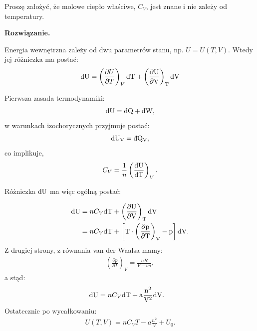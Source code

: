 \documentclass[11pt,a4paper]{article}
\newcommand{\dbar} {\ensuremath{\,\mathchar'26\mkern-12mu d}}
\newenvironment{solution}{\vspace{1cm} \par\textbf{Rozwiązanie.} \vspace{1cm}}{}
\begin{document}
Proszę założyć, że molowe ciepło właściwe, $C_V$, jest znane i nie zależy od temperatury.

\begin{solution}

Energia wewnętrzna zależy od dwu parametrów stanu, np. $U = U(T, V)$. Wtedy jej różniczka ma postać:
\begin{align}
  \rm{d} U &= \left(\frac{\partial U}{\partial T} \right)_V \rm{d}T  + \left(\frac{\partial U}{\partial V} \right)_T \rm{d}V \\
\end{align}

Pierwsza zasada termodynamiki:
\begin{align}
\rm{d}U = \rm{\dbar}Q + \rm{\dbar}W,
\end{align}
w warunkach izochorycznych przyjmuje postać:
\begin{align}
\rm{d}U_V = \rm{\dbar}Q _V, 
\end{align}
co implikuje,
\begin{align}
C_V = \frac{1}{n}\left( \frac{\rm{d}U}{\rm{d}T}\right)_V.
\end{align}

Różniczka $\rm{d}U$ ma więc ogólną postać:

\begin{align}
  \rm{d} U &= n C_V \rm{d}T + \left(\frac{\partial U}{\partial V} \right)_T \rm{d}V \\
 &= n C_V \rm{d}T + \left[    T \cdot \left(\frac{\partial p}{\partial T}\right)_V - p\right] \rm{d}V.
\end{align}
 Z drugiej strony, z równania van der Waalsa mamy:
 \begin{align}
 \left( \frac{\partial p}{\partial T} \right)_V = \frac{nR}{V - bn},
 \end{align}
 a stąd: 
 \begin{align}
  \rm{d} U &=  n C_V \rm{d} T + a \frac{n^2}{V^2} \rm{d}V.
 \end{align}
 Ostatecznie po wycałkowaniu:
 \begin{align}
 U(T, V) = n C_V T - a \frac{n^2}{V}  + U_0.
 \end{align}


\newpage   
\end{solution}
\end{document}
